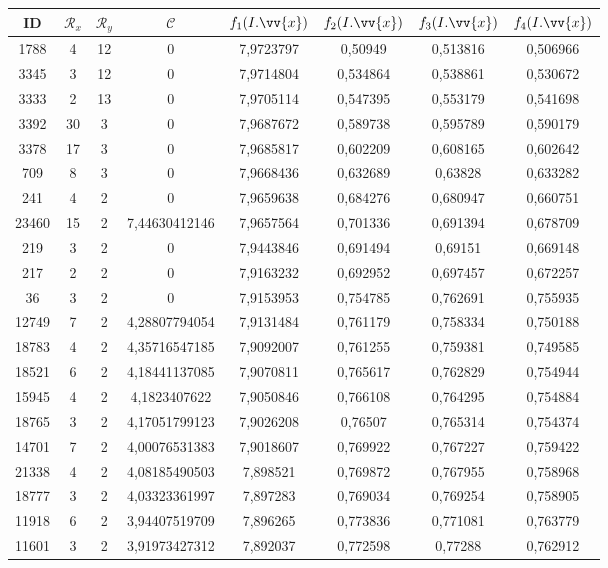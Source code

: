 \scriptsize
\begin{longtable}{|c|c|c|c|c|c|c|c|}
\hline
ID & $\mathscr{R}_x$ & $\mathscr{R}_y$ & $\mathscr{C}$ & $f_1(I.\vv{x})$ & $f_2(I.\vv{x})$ & $f_3(I.\vv{x})$ & $f_4(I.\vv{x})$ \\
\hline
1788 & 4 & 12 & 0 & 7,9723797 & 0,50949 & 0,513816 & 0,506966 \\
3345 & 3 & 12 & 0 & 7,9714804 & 0,534864 & 0,538861 & 0,530672 \\
3333 & 2 & 13 & 0 & 7,9705114 & 0,547395 & 0,553179 & 0,541698 \\
3392 & 30 & 3 & 0 & 7,9687672 & 0,589738 & 0,595789 & 0,590179 \\
3378 & 17 & 3 & 0 & 7,9685817 & 0,602209 & 0,608165 & 0,602642 \\
709 & 8 & 3 & 0 & 7,9668436 & 0,632689 & 0,63828 & 0,633282 \\
241 & 4 & 2 & 0 & 7,9659638 & 0,684276 & 0,680947 & 0,660751 \\
23460 & 15 & 2 & 7,44630412146 & 7,9657564 & 0,701336 & 0,691394 & 0,678709 \\
219 & 3 & 2 & 0 & 7,9443846 & 0,691494 & 0,69151 & 0,669148 \\
217 & 2 & 2 & 0 & 7,9163232 & 0,692952 & 0,697457 & 0,672257 \\
36 & 3 & 2 & 0 & 7,9153953 & 0,754785 & 0,762691 & 0,755935 \\
12749 & 7 & 2 & 4,28807794054 & 7,9131484 & 0,761179 & 0,758334 & 0,750188 \\
18783 & 4 & 2 & 4,35716547185 & 7,9092007 & 0,761255 & 0,759381 & 0,749585 \\
18521 & 6 & 2 & 4,18441137085 & 7,9070811 & 0,765617 & 0,762829 & 0,754944 \\
15945 & 4 & 2 & 4,1823407622 & 7,9050846 & 0,766108 & 0,764295 & 0,754884 \\
18765 & 3 & 2 & 4,17051799123 & 7,9026208 & 0,76507 & 0,765314 & 0,754374 \\
14701 & 7 & 2 & 4,00076531383 & 7,9018607 & 0,769922 & 0,767227 & 0,759422 \\
21338 & 4 & 2 & 4,08185490503 & 7,898521 & 0,769872 & 0,767955 & 0,758968 \\
18777 & 3 & 2 & 4,03323361997 & 7,897283 & 0,769034 & 0,769254 & 0,758905 \\
11918 & 6 & 2 & 3,94407519709 & 7,896265 & 0,773836 & 0,771081 & 0,763779 \\
11601 & 3 & 2 & 3,91973427312 & 7,892037 & 0,772598 & 0,77288 & 0,762912 \\

\end{longtable}
